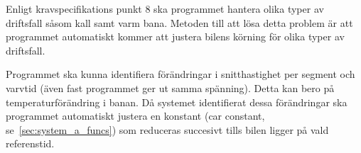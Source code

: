 Enligt kravspecifikations punkt 8 ska programmet hantera olika typer av
driftsfall såsom kall samt varm bana.  Metoden till att lösa detta problem är
att programmet automatiskt kommer att justera bilens körning för olika typer av
driftsfall. 


Programmet ska kunna identifiera förändringar i snitthastighet per
segment och varvtid (även fast programmet ger ut samma spänning). Detta kan bero på temperaturförändring i banan. Då systemet identifierat dessa förändringar ska programmet
automatiskt justera en konstant (car constant, se~\ref{sec:system_a_funcs}) som reduceras succesivt tills bilen ligger på vald referenstid. 


